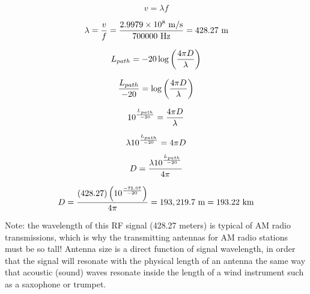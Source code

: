 $$v = \lambda f$$

$$\lambda = {v \over f} = {2.9979 \times 10^{8} \hbox{ m/s} \over 700000 \hbox{ Hz}} = 428.27 \hbox{ m}$$

\vskip 10pt

$$L_{path} = -20 \log \left(4 \pi D \over \lambda \right)$$

$${L_{path} \over -20} = \log \left(4 \pi D \over \lambda \right)$$

$$10^{L_{path} \over -20} = {4 \pi D \over \lambda}$$

$$\lambda 10^{L_{path} \over -20} = 4 \pi D$$

$$D = {\lambda 10^{L_{path} \over -20} \over 4 \pi}$$

$$D = {(428.27) \left(10^{-75.07 \over -20} \right) \over 4 \pi} = 193,219.7 \hbox{ m} = 193.22 \hbox{ km}$$

\vskip 10pt

Note: the wavelength of this RF signal (428.27 meters) is typical of AM radio transmissions, which is why the transmitting antennas for AM radio stations must be so tall!  Antenna size is a direct function of signal wavelength, in order that the signal will resonate with the physical length of an antenna the same way that acoustic (sound) waves resonate inside the length of a wind instrument such as a saxophone or trumpet.











